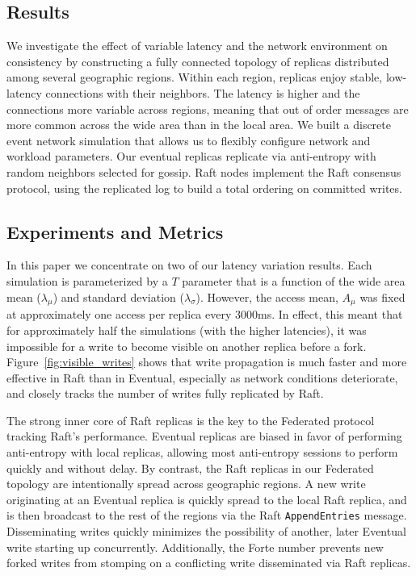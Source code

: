 \documentclass[10pt,conference,letterpaper]{IEEEtran}
\begin{document}
\subsection{Results}
\label{sec:results-1}

We investigate the effect of variable latency and the network environment on consistency
by constructing a fully connected topology of replicas distributed among several
geographic regions.
Within each region, replicas enjoy stable, low-latency connections with their neighbors.
The latency is higher and the connections more variable across regions, meaning that out
of order messages are more common across the wide area than in the local area.
We built a discrete event network simulation that allows us to flexibly configure network
and workload parameters.
Our eventual replicas replicate via anti-entropy with random neighbors selected for
gossip.
Raft nodes implement the Raft consensus protocol, using the replicated log to build a
total ordering on committed writes.

\subsection{Experiments and Metrics}

In this paper we concentrate on two of our latency variation results.
Each simulation is parameterized by a $T$ parameter that is a function of the
wide area mean ($\lambda_{\mu}$) and standard deviation ($\lambda_{\sigma}$).
However, the access mean, $A_{\mu}$ was fixed at approximately one access per replica every
3000ms.
In effect, this meant that for approximately half the simulations (with the higher
latencies), it was impossible for a write to become visible on another replica before a
fork.
Figure~\ref{fig:visible_writes} shows that
write propagation is much faster and more effective in Raft than in Eventual,
especially as network conditions deteriorate, and 
closely tracks the number of writes fully
replicated by Raft.

The strong inner core of Raft replicas is the key to the Federated protocol
tracking Raft's performance.
Eventual replicas are biased in favor of performing anti-entropy with local
replicas, allowing most anti-entropy sessions to perform quickly and without
delay.
By contrast, the Raft replicas in our Federated topology are intentionally
spread across geographic regions.
A new write originating at an Eventual replica is quickly spread to the local
Raft replica, and is then broadcast to the rest of the regions via the Raft
\texttt{AppendEntries} message.
Disseminating writes quickly minimizes the possibility of another, later
Eventual write starting up concurrently.
Additionally, the Forte number prevents new forked writes from stomping on a
conflicting write disseminated via Raft replicas.
\end{document}
